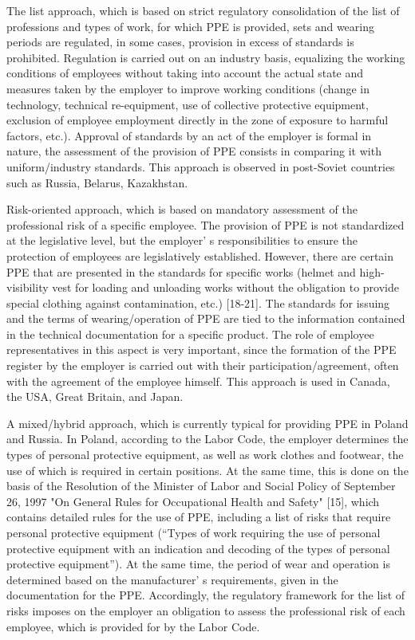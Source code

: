 \begin{multicols}{2}
The list approach, which is based on strict regulatory consolidation of
the list of professions and types of work, for which PPE is provided,
sets and wearing periods are regulated, in some cases, provision in
excess of standards is prohibited. Regulation is carried out on an
industry basis, equalizing the working conditions of employees without
taking into account the actual state and measures taken by the employer
to improve working conditions (change in technology, technical
re-equipment, use of collective protective equipment, exclusion of
employee employment directly in the zone of exposure to harmful factors,
etc.). Approval of standards by an act of the employer is formal in
nature, the assessment of the provision of PPE consists in comparing it
with uniform/industry standards. This approach is observed in
post-Soviet countries such as Russia, Belarus, Kazakhstan.

Risk-oriented approach, which is based on mandatory assessment of the
professional risk of a specific employee. The provision of PPE is not
standardized at the legislative level, but the
employer' s responsibilities to ensure the protection of
employees are legislatively established. However, there are certain PPE
that are presented in the standards for specific works (helmet and
high-visibility vest for loading and unloading works without the
obligation to provide special clothing against contamination, etc.)
{[}18-21{]}. The standards for issuing and the terms of
wearing/operation of PPE are tied to the information contained in the
technical documentation for a specific product. The role of employee
representatives in this aspect is very important, since the formation of
the PPE register by the employer is carried out with their
participation/agreement, often with the agreement of the employee
himself. This approach is used in Canada, the USA, Great Britain, and
Japan.

A mixed/hybrid approach, which is currently typical for providing PPE in
Poland and Russia. In Poland, according to the Labor Code, the employer
determines the types of personal protective equipment, as well as work
clothes and footwear, the use of which is required in certain positions.
At the same time, this is done on the basis of the Resolution of the
Minister of Labor and Social Policy of September 26, 1997 "On General
Rules for Occupational Health and Safety" {[}15{]}, which contains
detailed rules for the use of PPE, including a list of risks that
require personal protective equipment (``Types of work requiring the use
of personal protective equipment with an indication and decoding of the
types of personal protective equipment''). At the same time, the period
of wear and operation is determined based on the
manufacturer' s requirements, given in the documentation
for the PPE. Accordingly, the regulatory framework for the list of risks
imposes on the employer an obligation to assess the professional risk of
each employee, which is provided for by the Labor Code.


\end{multicols}
